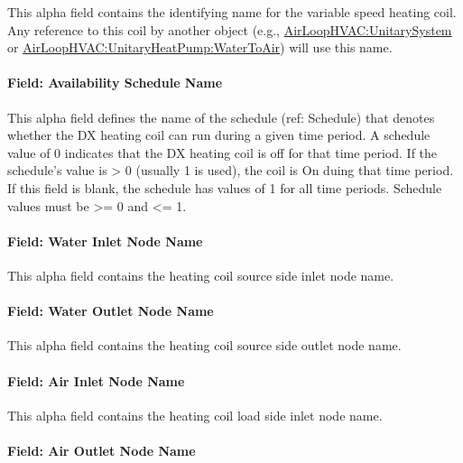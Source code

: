 This alpha field contains the identifying name for the variable speed heating coil. Any reference to this coil by another object (e.g., \hyperref[airloophvacunitarysystem]{AirLoopHVAC:UnitarySystem} or \hyperref[airloophvacunitaryheatpumpwatertoair]{AirLoopHVAC:UnitaryHeatPump:WaterToAir}) will use this name.

\paragraph{Field: Availability Schedule Name}\label{field-availability-schedule-name-16-012}

This alpha field defines the name of the schedule (ref: Schedule) that denotes whether the DX heating coil can run during a given time period. A schedule value of 0 indicates that the DX heating coil is off for that time period. If the schedule's value is \textgreater{} 0 (usually 1 is used), the coil is On duing that time period. If this field is blank, the schedule has values of 1 for all time periods. Schedule values must be \textgreater{}= 0 and \textless{}= 1.

\paragraph{Field: Water Inlet Node Name}\label{field-water-inlet-node-name-10}

This alpha field contains the heating coil source side inlet node name.

\paragraph{Field: Water Outlet Node Name}\label{field-water-outlet-node-name-10}

This alpha field contains the heating coil source side outlet node name.

\paragraph{Field: Air Inlet Node Name}\label{field-air-inlet-node-name-21}

This alpha field contains the heating coil load side inlet node name.

\paragraph{Field: Air Outlet Node Name}\label{field-air-outlet-node-name-21}

